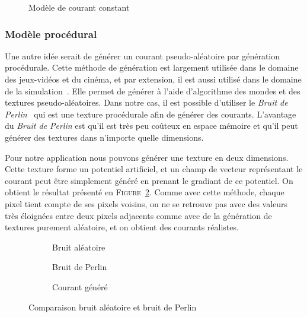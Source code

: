 				\begin{figure}[!htb]
					\centering
					\caption{Modèle de courant constant}
					\label{fig:constant}
				\end{figure}

			\subsubsection{Modèle procédural}

				Une autre idée serait de générer un courant pseudo-aléatoire par génération procédurale. Cette méthode de génération est largement utilisée dans le domaine des jeux-vidéos et du cinéma, et par extension, il est aussi utilisé dans le domaine de la simulation~\cite{generation_procedurale_monde, volumetric_terrain_generation}. Elle permet de générer à l'aide d'algorithme des mondes et des textures pseudo-aléatoires. Dans notre cas, il est possible d'utiliser le \textit{Bruit de Perlin}~\cite{PerlinNoise} qui est une texture procédurale afin de générer des courants. L'avantage du \textit{Bruit de Perlin} est qu'il est très peu coûteux en espace mémoire et qu'il peut générer des textures dans n'importe quelle dimensions. 
				
				Pour notre application nous pouvons générer une texture en deux dimensions. Cette texture forme un potentiel artificiel, et un champ de vecteur représentant le courant peut être simplement généré en prenant le gradiant de ce potentiel. On obtient le résultat présenté en \textsc{Figure}~\ref{fig:perlin_noise}. Comme avec cette méthode, chaque pixel tient compte de ses pixels voisins, on ne se retrouve pas avec des valeurs très éloignées entre deux pixels adjacents comme avec de la génération de textures purement aléatoire, et on obtient des courants réalistes.

				\begin{figure}[!htb]
					\centering
					\begin{subfigure}[b]{0.32\textwidth}
						\centering
						\caption{Bruit aléatoire}
					\end{subfigure}
					\hfill
					\begin{subfigure}[b]{0.32\textwidth}
						\centering
						\caption{Bruit de Perlin}
					\end{subfigure}
					\hfill
					\begin{subfigure}[b]{0.32\textwidth}
						\centering
						\caption{Courant généré}
					\end{subfigure}
					\caption{Comparaison bruit aléatoire et bruit de Perlin}
					\label{fig:perlin_noise}
				\end{figure}

